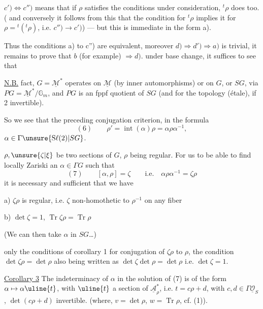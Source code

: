$c')\Longleftrightarrow c'')$ means that if $\rho$ satisfies the conditions under consideration, ${}^t\rho$ does too. ( and conversely it follows from this that the condition for ${}^t\rho$ implies it for $\rho={}^t({}^t\rho)$\deleted{\unsure{$\}$}}, i.e. $c'')\longrightarrow c')$) --- but this is immediate in the form a).

Thus the conditions a) to c'') are equivalent, moreover $d)\Longrightarrow d')\Longrightarrow a)$ is trivial, it remains to prove that $b$ (for example) $\Rightarrow d)$.
 under base change, it suffices to see that




\uline{N.B.}\quad {} fact, $G=\underline{\mathcal M}^{*}$ operates on $\underline{\mathcal M}$ (by inner automorphisms) or on $G$, or $SG$, via $PG=\underline{\mathcal M}^{*}/\mathbb G_m$, and $PG$ is an fppf quotient of $SG$ (and  for the topology (étale), if 2 invertible).

So we see that  the preceding conjugation criterion, in the formula
\[
(6)\qquad \rho'=\operatorname{int}(\alpha)\rho=\alpha\rho\alpha^{-1},
\]
 $\alpha\in\Gamma\unsure{\mathrm S\ell(2)|SG}$.

 $\rho,\unsure{\zeta|\xi}$ be two sections of $G$, $\rho$ being regular. For us to be able to find locally Zariski an $\alpha\in\Gamma G$ such that
\[
(7)\qquad [\alpha,\rho]=\zeta\qquad\text{i.e.}\quad \alpha\rho\alpha^{-1}=\zeta\rho
\]
it is necessary and sufficient that we have

a) $\zeta\rho$ is regular, i.e. $\zeta$ \deleted{$\unsure{\neq}$} non-homothetic to $\rho^{-1}$ on any fiber

b) $\det\zeta=1$, $\operatorname{Tr}\zeta\rho=\operatorname{Tr}\rho$

(We can then take $\alpha$ in $SG$\ldots)

 only the conditions of corollary 1  for conjugation of $\zeta\rho$ to $\rho$, the condition $\det\zeta\rho=\det\rho$ also being written as $\det\zeta\det\rho=\det\rho$ i.e. $\det\zeta=1$.

\uline{Corollary 3} The indeterminacy of $\alpha$ in the solution of (7) is of the form $\alpha\mapsto\alpha\uline{t}$, with $\uline{t}$ a section of $\underline{\mathcal A}_\rho^*$, i.e. $t=c\rho+d$, with $c,d\in\Gamma\underline{\mathcal O}_S$, $\det(c\rho+d)$ invertible.
(where, $v=\det\rho$, $w=\operatorname{Tr}\rho$, cf. (1)).

